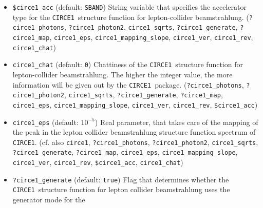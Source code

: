 \documentclass[12pt]{book}
\newcommand{\ttt}[1]{\texttt{#1}}
\newcommand{\circeone}{\texttt{CIRCE1}}
\begin{document}
\begin{itemize}
\ttt{circe1} \newline
Beam structure specifier for the \circeone\ structure function for
beamstrahlung at a linear lepton collider: \ttt{beams = e1, E1 =>
circe1}. Note that this is a pair spectrum, so the specifier acts for
both beams simultaneously. (cf. also \ttt{beams}, \ttt{?circe1\_photons},
\ttt{?circe1\_photon2}, \ttt{circe1\_sqrts},  
\ttt{?circe1\_generate}, \ttt{?circe1\_map},
\ttt{circe1\_eps}, \newline \ttt{circe1\_mapping\_slope}, \ttt{circe1\_ver},
\ttt{circe1\_rev}, \ttt{\$circe1\_acc}, \ttt{circe1\_chat})
\item
\ttt{\$circe1\_acc} \qquad (default: \ttt{SBAND}) \newline
String variable that specifies the accelerator type for the \circeone\
structure function for lepton-collider beamstrahlung. 
(\ttt{?circe1\_photons}, \ttt{?circe1\_photon2}, \ttt{circe1\_sqrts},  
\ttt{?circe1\_generate}, \ttt{?circe1\_map},
\ttt{circe1\_eps}, \ttt{circe1\_mapping\_slope}, \ttt{circe1\_ver},
\newline \ttt{circe1\_rev}, \ttt{circe1\_chat})
\item
\ttt{circe1\_chat} \qquad (default: \ttt{0}) \newline
Chattiness of the \circeone\ structure function for lepton-collider
beamstrahlung. The higher the integer value, the more information will
be given out by the \circeone\ package. (\ttt{?circe1\_photons},
\ttt{?circe1\_photon2}, \ttt{circe1\_sqrts},   
\ttt{?circe1\_generate}, \ttt{?circe1\_map},
\ttt{circe1\_eps}, \ttt{circe1\_mapping\_slope}, \ttt{circe1\_ver},
\newline \ttt{circe1\_rev}, \ttt{\$circe1\_acc})
\item
\ttt{circe1\_eps} \qquad (default: $10^{-5}$) \newline
Real parameter, that takes care of the mapping of the peak in the
lepton collider beamstrahlung structure function spectrum of
\circeone.  (cf. also \ttt{circe1}, \ttt{?circe1\_photons},
\ttt{?circe1\_photon2}, \ttt{circe1\_sqrts},  
\ttt{?circe1\_generate}, \ttt{?circe1\_map},
\ttt{circe1\_eps}, \newline \ttt{circe1\_mapping\_slope}, \ttt{circe1\_ver},
\ttt{circe1\_rev}, \ttt{\$circe1\_acc}, \ttt{circe1\_chat})
\item
\ttt{?circe1\_generate} \qquad (default: \ttt{true}) \newline
Flag that determines whether the \circeone\ structure function for
lepton collider beamstrahlung uses the generator mode for the

\end{itemize}
\end{document}
